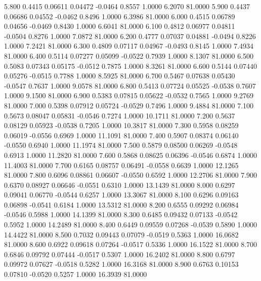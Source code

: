    5.800   0.4415   0.06611   0.04472  -0.0464   0.8557   1.0000   6.2070  81.0000
   5.900   0.4437   0.06686   0.04552  -0.0462   0.8496   1.0000   6.3986  81.0000
   6.000   0.4515   0.06789   0.04656  -0.0469   0.8430   1.0000   6.6041  81.0000
   6.100   0.4812   0.06977   0.04811  -0.0504   0.8276   1.0000   7.0872  81.0000
   6.200   0.4777   0.07037   0.04881  -0.0494   0.8226   1.0000   7.2421  81.0000
   6.300   0.4809   0.07117   0.04967  -0.0493   0.8145   1.0000   7.4934  81.0000
   6.400   0.5114   0.07277   0.05099  -0.0522   0.7939   1.0000   8.1307  81.0000
   6.500   0.5083   0.07343   0.05175  -0.0512   0.7875   1.0000   8.3261  81.0000
   6.600   0.5144   0.07440   0.05276  -0.0515   0.7788   1.0000   8.5925  81.0000
   6.700   0.5467   0.07638   0.05430  -0.0547   0.7637   1.0000   9.0578  81.0000
   6.800   0.5413   0.07724   0.05525  -0.0538   0.7607   1.0000   9.1500  81.0000
   6.900   0.5383   0.07815   0.05622  -0.0532   0.7565   1.0000   9.2769  81.0000
   7.000   0.5398   0.07912   0.05724  -0.0529   0.7496   1.0000   9.4884  81.0000
   7.100   0.5673   0.08047   0.05831  -0.0546   0.7274   1.0000  10.1711  81.0000
   7.200   0.5637   0.08129   0.05923  -0.0538   0.7205   1.0000  10.3817  81.0000
   7.300   0.5958   0.08259   0.06019  -0.0556   0.6969   1.0000  11.1091  81.0000
   7.400   0.5907   0.08374   0.06140  -0.0550   0.6940   1.0000  11.1974  81.0000
   7.500   0.5879   0.08500   0.06269  -0.0548   0.6913   1.0000  11.2820  81.0000
   7.600   0.5868   0.08625   0.06396  -0.0546   0.6874   1.0000  11.4003  81.0000
   7.700   0.6165   0.08757   0.06491  -0.0558   0.6639   1.0000  12.1265  81.0000
   7.800   0.6096   0.08861   0.06607  -0.0550   0.6592   1.0000  12.2706  81.0000
   7.900   0.6370   0.08927   0.06646  -0.0551   0.6310   1.0000  13.1439  81.0000
   8.000   0.6297   0.09041   0.06770  -0.0544   0.6257   1.0000  13.3067  81.0000
   8.100   0.6296   0.09163   0.06898  -0.0541   0.6184   1.0000  13.5312  81.0000
   8.200   0.6555   0.09292   0.06984  -0.0546   0.5988   1.0000  14.1399  81.0000
   8.300   0.6485   0.09432   0.07133  -0.0542   0.5952   1.0000  14.2489  81.0000
   8.400   0.6449   0.09559   0.07268  -0.0539   0.5890   1.0000  14.4422  81.0000
   8.500   0.7032   0.09443   0.07079  -0.0519   0.5363   1.0000  16.0682  81.0000
   8.600   0.6922   0.09618   0.07264  -0.0517   0.5336   1.0000  16.1522  81.0000
   8.700   0.6846   0.09792   0.07444  -0.0517   0.5307   1.0000  16.2402  81.0000
   8.800   0.6797   0.09972   0.07627  -0.0518   0.5282   1.0000  16.3168  81.0000
   8.900   0.6763   0.10153   0.07810  -0.0520   0.5257   1.0000  16.3939  81.0000
